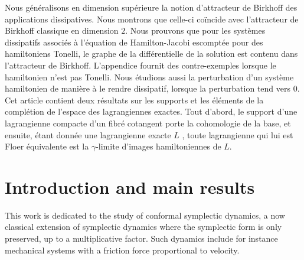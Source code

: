 \documentclass[JEP,XML,SOM,Unicode,NoFloatCountersInSection,published]{cedram}
\theoremstyle{definition}
\begin{document}



\begin{altabstract}
Nous généralisons en dimension supérieure la notion d’attracteur de Birkhoff des applications dissipatives. Nous montrons que celle-ci coïncide avec l’attracteur de Birkhoff classique en dimension $2$. Nous prouvons que pour les systèmes dissipatifs associés à l’équation de Hamilton-Jacobi escomptée pour des hamil\-toniens Tonelli, le graphe de la différentielle de la solution est contenu dans l’attracteur de Birkhoff. L’appendice fournit des contre-exemples lorsque le hamiltonien n'est pas Tonelli. Nous étudions aussi la perturbation d'un système hamiltonien de manière à le rendre dissipatif, lorsque la perturbation tend vers $0$. Cet article contient deux résultats sur les supports et les éléments de la complétion de l’espace des lagrangiennes exactes. Tout d’abord, le support d’une lagrangienne compacte d’un fibré cotangent porte la cohomologie de la base, et ensuite, étant donnée une lagrangienne exacte $L$ , toute lagrangienne qui lui est Floer équivalente est  la $\gamma$\nobreakdash-limite d’images hamiltoniennes de $L$.
\end{altabstract}

\maketitle
\vspace*{-\baselineskip}
{\let\footnotemark\relax\tableofcontents}
\mainmatter

\section{Introduction and main results}

This work is dedicated to the study of conformal symplectic dynamics, a now classical
extension of symplectic dynamics where the symplectic form is only preserved, up to a multiplicative factor.
Such dynamics include for instance
mechanical systems with a friction force proportional
to velocity.
\end{document}
